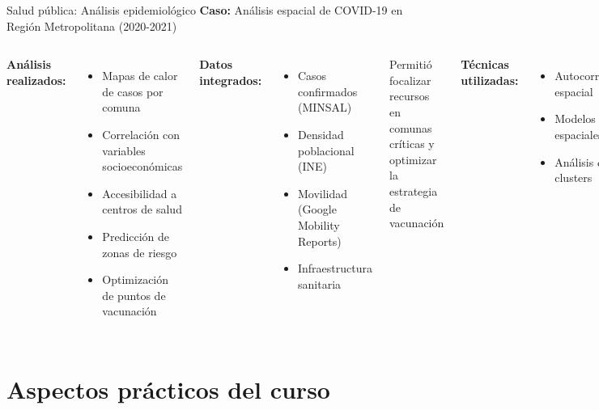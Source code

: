 \documentclass[10pt]{beamer}
\newcommand{\examplebox}[2]{
\begin{tcolorbox}[colframe=usachblue,colback=white,title=#1]
#2
\end{tcolorbox}
}
\begin{document}
\begin{frame}{Salud pública: Análisis epidemiológico}
    \textbf{Caso:} Análisis espacial de COVID-19 en Región Metropolitana (2020-2021)
    
    \begin{columns}
        \textbf{Análisis realizados:}
        \begin{itemize}
            \item Mapas de calor de casos por comuna
            \item Correlación con variables socioeconómicas
            \item Accesibilidad a centros de salud
            \item Predicción de zonas de riesgo
            \item Optimización de puntos de vacunación
        \end{itemize}
        
        \textbf{Datos integrados:}
        \begin{itemize}
            \item Casos confirmados (MINSAL)
            \item Densidad poblacional (INE)
            \item Movilidad (Google Mobility Reports)
            \item Infraestructura sanitaria
        \end{itemize}
        
        \examplebox{Impacto:}{
            Permitió focalizar recursos en comunas críticas y optimizar la estrategia de vacunación
        }
        
        \vspace{0.3cm}
        \textbf{Técnicas utilizadas:}
        \begin{itemize}
            \item Autocorrelación espacial
            \item Modelos SIR espaciales
            \item Análisis de clusters
        \end{itemize}
    \end{columns}
\end{frame}

\section{Aspectos prácticos del curso}
\end{document}
